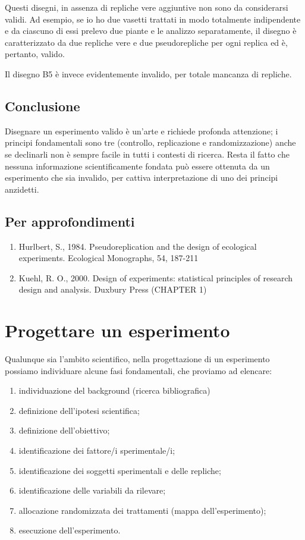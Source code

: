 \documentclass[a4paper,12pt,oneside]{book}
\providecommand{\tightlist}{%
  \setlength{\itemsep}{0pt}\setlength{\parskip}{0pt}}
\theoremstyle{definition}
\theoremstyle{definition}
\theoremstyle{definition}
\theoremstyle{remark}
\begin{document}
Questi disegni, in assenza di repliche vere aggiuntive non sono da
considerarsi validi. Ad esempio, se io ho due vasetti trattati in modo
totalmente indipendente e da ciascuno di essi prelevo due piante e le
analizzo separatamente, il disegno è caratterizzato da due repliche vere
e due pseudorepliche per ogni replica ed è, pertanto, valido.

Il disegno B5 è invece evidentemente invalido, per totale mancanza di
repliche.

\section{Conclusione}\label{conclusione}

Disegnare un esperimento valido è un'arte e richiede profonda
attenzione; i principi fondamentali sono tre (controllo, replicazione e
randomizzazione) anche se declinarli non è sempre facile in tutti i
contesti di ricerca. Resta il fatto che nessuna informazione
scientificamente fondata può essere ottenuta da un esperimento che sia
invalido, per cattiva interpretazione di uno dei principi anzidetti.

\section{Per approfondimenti}\label{per-approfondimenti}

\begin{enumerate}
\def\labelenumi{\arabic{enumi}.}
\tightlist
\item
  Hurlbert, S., 1984. Pseudoreplication and the design of ecological
  experiments. Ecological Monographs, 54, 187-211
\item
  Kuehl, R. O., 2000. Design of experiments: statistical principles of
  research design and analysis. Duxbury Press (CHAPTER 1)
\end{enumerate}

\chapter{Progettare un esperimento}\label{progettare-un-esperimento}

Qualunque sia l'ambito scientifico, nella progettazione di un
esperimento possiamo individuare alcune fasi fondamentali, che proviamo
ad elencare:

\begin{enumerate}
\def\labelenumi{\arabic{enumi}.}
\tightlist
\item
  individuazione del background (ricerca bibliografica)
\item
  definizione dell'ipotesi scientifica;
\item
  definizione dell'obiettivo;
\item
  identificazione dei fattore/i sperimentale/i;
\item
  identificazione dei soggetti sperimentali e delle repliche;
\item
  identificazione delle variabili da rilevare;
\item
  allocazione randomizzata dei trattamenti (mappa dell'esperimento);
\item
  esecuzione dell'esperimento.
\end{enumerate}
\end{document}
